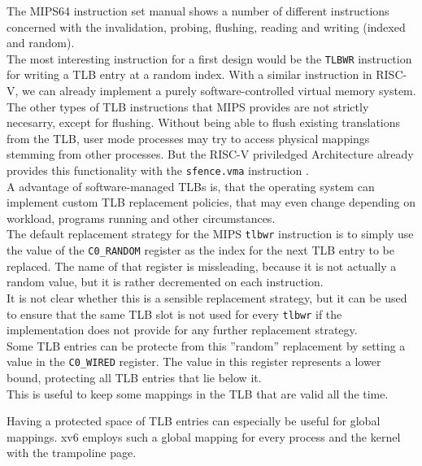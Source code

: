 The MIPS64 instruction set manual \cite{MIPSArchitectureProgrammers2016}
shows a number of different instructions concerned with the invalidation, probing, flushing, reading
and writing (indexed and random).\\
The most interesting instruction for a first design would be the \texttt{TLBWR} instruction for writing a TLB
entry at a random index. With a similar instruction in RISC-V, we can already implement a purely
software-controlled virtual memory system.\\
The other types of TLB instructions that MIPS provides are not strictly necesarry,
except for flushing. Without being able to flush existing translations from the TLB,
user mode processes may try to access physical mappings stemming from other processes.
But the RISC-V priviledged Architecture already provides this functionality
with the \texttt{sfence.vma} instruction \cite{riscvreader}.\\


A advantage of software-managed TLBs is, that the operating system can implement custom
TLB replacement policies, that may even change depending on workload, programs running
and other circumstances.\\
The default replacement strategy for the MIPS \texttt{tlbwr} instruction is to simply
use the value of the \texttt{C0\_RANDOM} register as the index for the next TLB entry
to be replaced. The name of that register is missleading, because it is not actually a
random value, but it is rather decremented on each instruction\cite{heiserAnatomyHighPerformanceMicrokernel}.\\
It is not clear whether this is a sensible replacement strategy,
but it can be used to ensure that the same TLB slot is not used for every \texttt{tlbwr} if the implementation
does not provide for any further replacement strategy.\\
Some TLB entries can be protecte from this ''random'' replacement by setting a value in the \texttt{C0\_WIRED}
register. The value in this register represents a lower bound, protecting all TLB entries that lie below it.\\
This is useful to keep some mappings in the TLB that are valid all the time.

Having a protected space of TLB entries can especially be useful for global mappings. xv6 employs such a global
mapping for every process and the kernel with the trampoline page.

